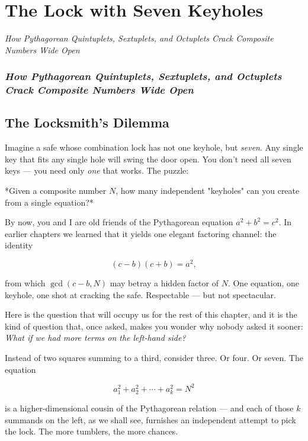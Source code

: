 \chapter{The Lock with Seven Keyholes}
\begin{center}\textit{How Pythagorean Quintuplets, Sextuplets, and Octuplets Crack Composite Numbers Wide Open}\end{center}
\bigskip

\subsection*{\textit{How Pythagorean Quintuplets, Sextuplets, and Octuplets Crack Composite Numbers Wide Open}}

\bigskip

\section*{The Locksmith's Dilemma}

Imagine a safe whose combination lock has not one keyhole, but \textit{seven}. Any single key that fits any single hole will swing the door open. You don't need all seven keys --- you need only \textit{one} that works. The puzzle:


\begin{displayquote}
*Given a composite number $N$, how many independent "keyholes" can you create from a single equation?*
\end{displayquote}


By now, you and I are old friends of the Pythagorean equation $a^2 + b^2 = c^2$. In earlier chapters we learned that it yields one elegant factoring channel: the identity

\[
(c - b)(c + b) = a^2,
\]

from which $\gcd(c - b, N)$ may betray a hidden factor of $N$. One equation, one keyhole, one shot at cracking the safe. Respectable --- but not spectacular.

Here is the question that will occupy us for the rest of this chapter, and it is the kind of question that, once asked, makes you wonder why nobody asked it sooner: \textit{What if we had more terms on the left-hand side?}

Instead of two squares summing to a third, consider three. Or four. Or seven. The equation

\[
a_1^2 + a_2^2 + \cdots + a_k^2 = N^2
\]

is a higher-dimensional cousin of the Pythagorean relation --- and each of those $k$ summands on the left, as we shall see, furnishes an independent attempt to pick the lock. The more tumblers, the more chances.

